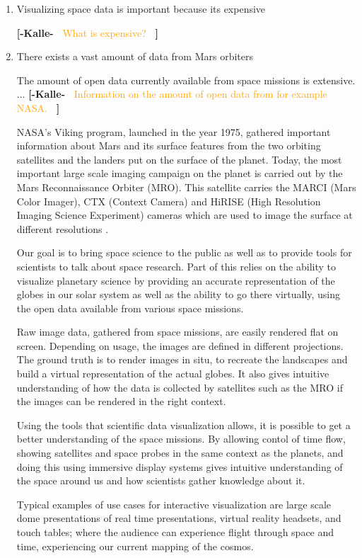 \documentclass[journal]{vgtc}                %
\newcommand{\kallecomment}[1]{\textbf{[-Kalle-~}
    \textcolor{orange}{#1}
    \textbf{~]}}
\begin{document}
\begin{enumerate}
\item Visualizing space data is important because its expensive

\kallecomment{What is expensive?}

\item There exists a vast amount of data from Mars orbiters

The amount of open data currently available from space missions is extensive.
... \kallecomment{Information on the amount of open data from for example NASA.}

NASA's Viking program, launched in the year 1975, gathered important information about Mars and its surface features from the two orbiting satellites and the landers put on the surface of the planet.
Today, the most important large scale imaging campaign on the planet is carried out by the Mars Reconnaissance Orbiter (MRO).
This satellite carries the MARCI (Mars Color Imager), CTX (Context Camera) and HiRISE (High Resolution Imaging Science Experiment) cameras which are used to image the surface at different resolutions \cite{mromission}.

Our goal is to bring space science to the public as well as to provide tools for scientists to talk about space research.
Part of this relies on the ability to visualize planetary science by providing an accurate representation of the globes in our solar system as well as the ability to go there virtually, using the open data available from various space missions.

Raw image data, gathered from space missions, are easily rendered flat on screen. Depending on usage, the images are defined in different projections.
The ground truth is to render images in situ, to recreate the landscapes and build a virtual representation of the actual globes.
It also gives intuitive understanding of how the data is collected by satellites such as the MRO if the images can be rendered in the right context.

Using the tools that scientific data visualization allows, it is possible to get a better understanding of the space missions.
By allowing contol of time flow, showing satellites and space probes in the same context as the planets, and doing this using immersive display systems gives intuitive understanding of the space around us and how scientists gather knowledge about it.

Typical examples of use cases for interactive visualization are large scale dome presentations of real time presentations, virtual reality headsets, and touch tables; where the audience can experience flight through space and time, experiencing our current mapping of the cosmos.


\end{enumerate}
\end{document}
